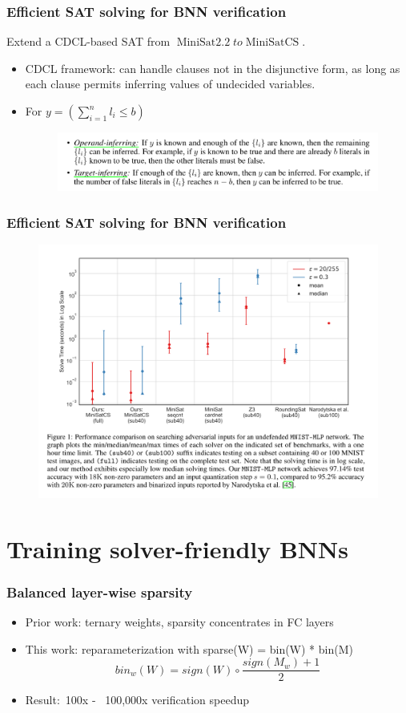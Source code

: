 \documentclass[aspectratio=169%
,serif,mathserif]{beamer}
\begin{document}
\begin{frame}
	\frametitle{Efficient SAT solving for BNN verification}
	Extend a CDCL-based SAT from $\operatorname{MiniSat 2.2}  to \operatorname{MiniSatCS}$.
	\begin{itemize}
		\item CDCL framework: can handle clauses not in the disjunctive form, as long as each clause permits inferring values of undecided variables.
		\item For $y=\left(\sum_{i=1}^{n} l_{i} \leq b\right)$
		\begin{figure}
			\includegraphics[width=0.8\linewidth]{2.png}
		\end{figure}
	\end{itemize}	
\end{frame}

\begin{frame}
	\frametitle{Efficient SAT solving for BNN verification}
	\begin{figure}
		\includegraphics[width=0.68\linewidth]{3.png}
	\end{figure}
	

\end{frame}

\section{Training solver-friendly BNNs}
\begin{frame}
	\frametitle{Balanced layer-wise sparsity}
		\begin{itemize}
			\item Prior work: ternary weights, sparsity concentrates in FC layers
			\item This work: reparameterization with sparse(W) = bin(W) * bin(M) 
			$$
				bin_w(W) = sign(W) \circ \frac{sign(M_w) + 1}{2}
			$$
			\item Result:~100x - ~100,000x verification speedup
\end{itemize}
\end{frame}
\end{document}
